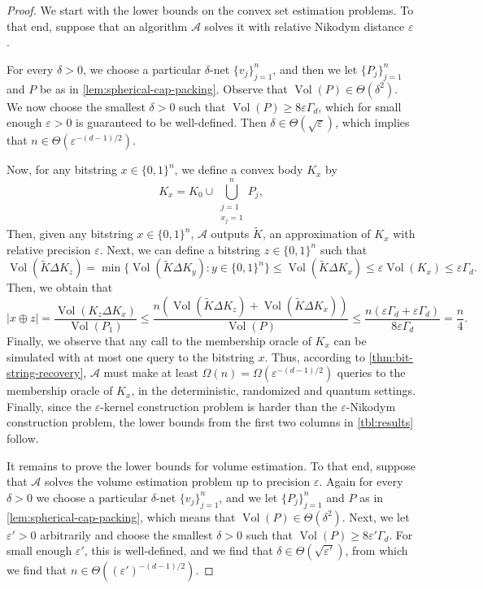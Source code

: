 \documentclass[11pt]{article}
\newcommand{\A}{\ensuremath{\mathcal{A}}}
\DeclareMathOperator{\Vol}{Vol}
\begin{document}
    \begin{proof}
        We start with the lower bounds on the convex set estimation problems. To that end, suppose that an algorithm $\A$ solves it with relative Nikodym distance $\varepsilon$.

        For every $\delta > 0$, we choose a particular $\delta$-net $\{v_j\}_{j=1}^n$, and then we let $\{P_j\}_{j=1}^n$ and $P$ be as in \cref{lem:spherical-cap-packing}. Observe that $\Vol(P) \in \Theta(\delta^2)$. We now choose the smallest $\delta > 0$ such that $\Vol(P) \geq 8\varepsilon\Gamma_d$, which for small enough $\varepsilon > 0$ is guaranteed to be well-defined. Then $\delta \in \Theta(\sqrt{\varepsilon})$, which implies that $n \in \Theta(\varepsilon^{-(d-1)/2})$.

        Now, for any bitstring $x \in \{0,1\}^n$, we define a convex body $K_x$ by
        \begin{equation}
            \label{eq:hard-instances}
            K_x = K_0 \cup \bigcup_{\substack{j = 1 \\ x_j = 1}}^n P_j,
        \end{equation}
        Then, given any bitstring $x \in \{0,1\}^n$, $\A$ outputs $\widetilde{K}$, an approximation of $K_x$ with relative precision $\varepsilon$. Next, we can define a bitstring $z \in \{0,1\}^n$ such that
        \[\Vol(\widetilde{K} \Delta K_z) = \min\{\Vol(\widetilde{K} \Delta K_y) : y \in \{0,1\}^n\} \leq \Vol(\widetilde{K} \Delta K_x) \leq \varepsilon\Vol(K_x) \leq \varepsilon\Gamma_d.\]
        Then, we obtain that
        \[|x \oplus z| = \frac{\Vol(K_z \Delta K_x)}{\Vol(P_1)} \leq \frac{n(\Vol(\widetilde{K} \Delta K_z) + \Vol(\widetilde{K} \Delta K_x))}{\Vol(P)} \leq \frac{n(\varepsilon\Gamma_d + \varepsilon\Gamma_d)}{8\varepsilon\Gamma_d} = \frac{n}{4}.\]
        Finally, we observe that any call to the membership oracle of $K_x$ can be simulated with at most one query to the bitstring $x$. Thus, according to \cref{thm:bit-string-recovery}, $\A$ must make at least $\Omega(n) = \Omega(\varepsilon^{-(d-1)/2})$ queries to the membership oracle of $K_x$, in the deterministic, randomized and quantum settings. Finally, since the $\varepsilon$-kernel construction problem is harder than the $\varepsilon$-Nikodym construction problem, the lower bounds from the first two columns in \cref{tbl:results} follow.

        It remains to prove the lower bounds for volume estimation. To that end, suppose that $\A$ solves the volume estimation problem up to precision $\varepsilon$. Again for every $\delta > 0$ we choose a particular $\delta$-net $\{v_j\}_{j=1}^n$, and we let $\{P_j\}_{j=1}^n$ and $P$ as in \cref{lem:spherical-cap-packing}, which means that $\Vol(P) \in \Theta(\delta^2)$. Next, we let $\varepsilon' > 0$ arbitrarily and choose the smallest $\delta > 0$ such that $\Vol(P) \geq 8\varepsilon'\Gamma_d$. For small enough $\varepsilon'$, this is well-defined, and we find that $\delta \in \Theta(\sqrt{\varepsilon'})$, from which we find that $n \in \Theta((\varepsilon')^{-(d-1)/2})$.


\end{proof}
\end{document}

